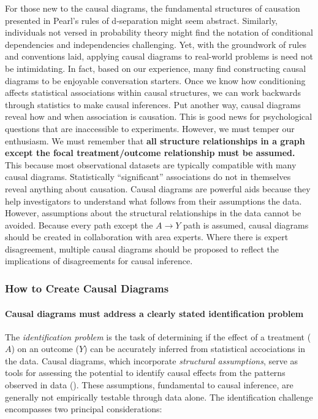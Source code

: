 \documentclass[
  singlecolumn]{article}
\let\oldparagraph\paragraph
\renewcommand{\paragraph}[1]{\oldparagraph{#1}\mbox{}}
\begin{document}
For those new to the causal diagrams, the fundamental structures of
causation presented in Pearl's rules of d-separation might seem
abstract. Similarly, individuals not versed in probability theory might
find the notation of conditional dependencies and independencies
challenging. Yet, with the groundwork of rules and conventions laid,
applying causal diagrams to real-world problems is need not be
intimidating. In fact, based on our experience, many find constructing
causal diagrams to be enjoyable conversation starters. Once we know how
conditioning affects statistical associations within causal structures,
we can work backwards through statistics to make causal inferences. Put
another way, causal diagrams reveal how and when association is
causation. This is good news for psychological questions that are
inaccessible to experiments. However, we must temper our enthusiasm. We
must remember that \textbf{all structure relationships in a graph except
the focal treatment/outcome relationship must be assumed.} This because
most observational datasets are typically compatible with many causal
diagrams. Statistically ``significant'' associations do not in
themselves reveal anything about causation. Causal diagrams are powerful
aids because they help investigators to understand what follows from
their assumptions the data. However, assumptions about the structural
relationships in the data cannot be avoided. Because every path except
the \(A\to Y\) path is assumed, causal diagrams should be created in
collaboration with area experts. Where there is expert disagreement,
multiple causal diagrams should be proposed to reflect the implications
of disagreements for causal inference.

\subsubsection{How to Create Causal
Diagrams}\label{how-to-create-causal-diagrams}

\paragraph{Causal diagrams must address a clearly stated identification
problem}\label{causal-diagrams-must-address-a-clearly-stated-identification-problem}

The \emph{identification problem} is the task of determining if the
effect of a treatment (\(A\)) on an outcome (\(Y\)) can be accurately
inferred from statistical accociations in the data. Causal diagrams,
which incorporate \emph{structural assumptions}, serve as tools for
assessing the potential to identify causal effects from the patterns
observed in data (). These assumptions, fundamental to causal inference, are
generally not empirically testable through data alone. The
identification challenge encompasses two principal considerations:
\end{document}
